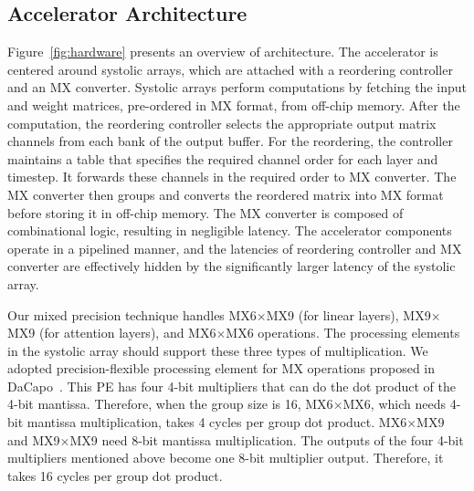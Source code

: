 \subsection{\sysname Accelerator Architecture}
\vspace{-0.1cm}
%
%
Figure~\ref{fig:hardware} presents an overview of \sysname architecture.
%
The accelerator is centered around systolic arrays, which are attached with a reordering controller and an MX converter.
%
Systolic arrays perform computations by fetching the input and weight matrices, pre-ordered in MX format, from off-chip memory.
%
After the computation, the reordering controller selects the appropriate output matrix channels from each bank of the output buffer. 
%
For the reordering, the controller maintains a table that specifies the required channel order for each layer and timestep.
%
It forwards these channels in the required order to MX converter.
%
The MX converter then groups and converts the reordered matrix into MX format before storing it in off-chip memory. 
% 
The MX converter is composed of combinational logic, resulting in negligible latency.
% 
The accelerator components operate in a pipelined manner, and the latencies of reordering controller and MX converter are effectively hidden by the significantly larger latency of the systolic array.

Our mixed precision technique handles MX6$\times$MX9 (for linear layers), MX9$\times$MX9 (for attention layers), and MX6$\times$MX6 operations. 
The processing elements in the systolic array should support these three types of multiplication. 
We adopted precision-flexible processing element for MX operations proposed in DaCapo~\cite{dacapo}. 
This PE has four 4-bit multipliers that can do the dot product of the 4-bit mantissa.
Therefore, when the group size is 16, MX6$\times$MX6, which needs 4-bit mantissa multiplication, takes 4 cycles per group dot product.
MX6$\times$MX9 and MX9$\times$MX9 need 8-bit mantissa multiplication.
The outputs of the four 4-bit multipliers mentioned above become one 8-bit multiplier output.
Therefore, it takes 16 cycles per group dot product.

